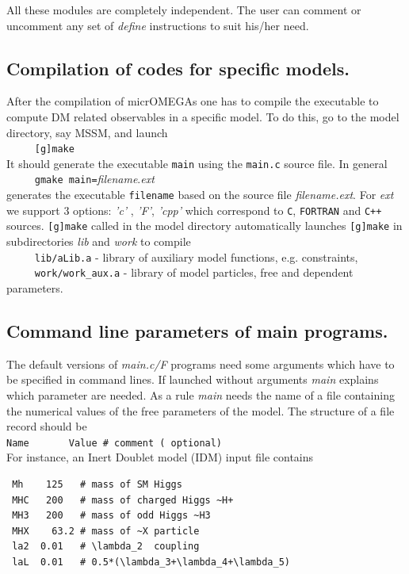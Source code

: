 \documentclass[12pt,a4paper]{article}
\begin{document}
All these modules are completely independent. The user can comment or
uncomment any set of {\it define} instructions to suit his/her need. 

\subsection{Compilation of codes for specific models.}
 After the compilation of micrOMEGAs one has to compile
the executable to compute DM related observables in a specific model. To
do this, go to the model directory, say MSSM,  and launch\\

\verb|     [g]make|\\
It should generate the executable {\tt main} using the {\tt main.c} source file. In
general\\

\verb|     gmake main=|{\it filename}.{\it ext}\\ 
generates the executable {\tt filename}  based on the source file {\it
filename.ext}.
For {\it ext}  we support 3 options: {\it 'c'} , {\it 'F'}, {\it 'cpp'} which correspond to
{\tt C}, {\tt FORTRAN} and {\tt C++} sources.
{\tt [g]make} called  in the model directory automatically  launches {\tt [g]make}
in subdirectories {\it lib} and {\it work} to compile \\
 \verb|     lib/aLib.a|   - library of auxiliary model functions, e.g. constraints,\\
 \verb|     work/work_aux.a| - library of model particles, free and dependent parameters.\\

\subsection{Command line parameters of main programs.}
\label{sec:command}
The default versions of {\it main.c/F}  programs need some arguments
which have to be specified in command lines. If launched without
arguments {\it main} explains which parameter are needed. 
As a rule  {\it main}  needs  the name of a file containing the
numerical values of the free parameters of the model. The structure of a file
record should be\\
\verb|Name       Value # comment ( optional)|\\
For instance, an Inert Doublet model (IDM) input file contains
\begin{verbatim}
 Mh    125   # mass of SM Higgs 
 MHC   200   # mass of charged Higgs ~H+
 MH3   200   # mass of odd Higgs ~H3
 MHX    63.2 # mass of ~X particle
 la2  0.01   # \lambda_2  coupling
 laL  0.01   # 0.5*(\lambda_3+\lambda_4+\lambda_5)
\end{verbatim}
\end{document}
